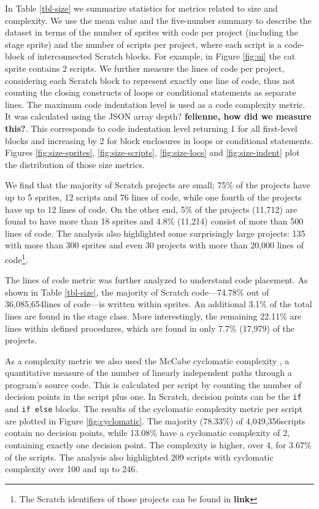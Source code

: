 \documentclass{sig-alternate}
\newcommand{\nLOC}{36,085,654}
\newcommand{\nscripts}{4,049,356}
\newcommand{\todo}[1]{\textbf{#1}}
\begin{document}
In Table \ref{tbl-size} we summarize statistics for metrics related to size and complexity. We use the mean value and the five-number summary to describe the dataset in terms of the number of sprites with code per project (including the stage sprite) and the number of scripts per project, where each script is a code-block of interconnected Scratch blocks. For example, in Figure \ref{fig:ui} the cat sprite contains 2 scripts. We further measure the lines of code per project, considering each Scratch block to represent exactly one line of code, thus not counting the closing constructs of loops or conditional statements as separate lines. The maximum code indentation level is used as a code complexity metric. It was calculated using the JSON array depth? \todo{felienne, how did we measure this?}. This corresponds to code indentation level returning 1 for all first-level blocks and increasing by 2 for block enclosures in loops or conditional statements. Figures \ref{fig:size-sprites}, \ref{fig:size-scripts}, \ref{fig:size-locs} and \ref{fig:size-indent} plot the distribution of those size metrics.

We find that the majority of Scratch projects are small; 75\% of the projects have up to 5 sprites, 12 scripts and 76 lines of code, while one fourth of the projects have up to 12 lines of code. On the other end, 5\% of the projects (11,712) are found to have more than 18 sprites and 4.8\% (11,214) consist of more than 500 lines of code. The analysis also highlighted some surprisingly large projects: 135 with more than 300 sprites and even 30 projects with more than 20,000 lines of code\footnote{The Scratch identifiers of those projects can be found in \todo{link}}.

The lines of code metric was further analyzed to understand code placement. As shown in Table \ref{tbl-size}, the majority of Scratch code---74.78\% out of \nLOC lines of code---is written within sprites. An additional 3.1\% of the total lines are found in the stage class. More interestingly, the remaining 22.11\% are lines within defined procedures, which are found in only 7.7\% (17,979) of the projects.

As a complexity metric we also used the McCabe cyclomatic complexity \cite{mcCabe76},  a quantitative measure of the number of linearly independent paths through a program's source code. This is calculated per script by counting the number of decision points in the script plus one. In Scratch, decision points can be the \texttt{if} and \texttt{if else} blocks. The results of the cyclomatic complexity metric per script are plotted in Figure \ref{fig:cyclomatic}. The majority (78.33\%) of \nscripts scripts contain no decision points, while 13.08\% have a cyclomatic complexity of 2, containing exactly one decision point. The complexity is higher, over 4, for 3.67\% of the scripts. The analysis also highlighted 209 scripts with cyclomatic complexity over 100 and up to 246.
\end{document}
